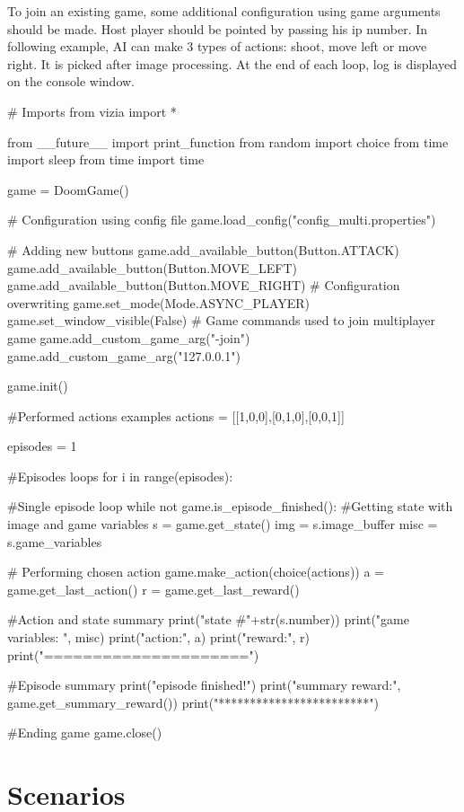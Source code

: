 \documentclass[english,bachelor,a4paper,twoside]{ppfcmthesis}
\begin{document}
	To join an existing game, some additional configuration using game arguments should be made. Host player should be pointed by passing his ip number. In following example, AI can make 3 types of actions: shoot, move left or move right. It is picked after image processing. At the end of each loop, log is displayed on the console window.

\begin{pblock}
# Imports
from vizia import *

from __future__ import print_function
from random import choice
from time import sleep
from time import time

game = DoomGame()

# Configuration using config file
game.load_config("config_multi.properties")

# Adding new buttons
game.add_available_button(Button.ATTACK)
game.add_available_button(Button.MOVE_LEFT)
game.add_available_button(Button.MOVE_RIGHT)
# Configuration overwriting 
game.set_mode(Mode.ASYNC_PLAYER)
game.set_window_visible(False)
# Game commands used to join multiplayer game
game.add_custom_game_arg("-join")
game.add_custom_game_arg("127.0.0.1")

game.init()

#Performed actions examples
actions = [[1,0,0],[0,1,0],[0,0,1]]

episodes = 1

#Episodes loops
for i in range(episodes):
	
	#Single episode loop
	while not game.is_episode_finished():
		#Getting state with image and game variables			
		s = game.get_state()
		img = s.image_buffer
		misc = s.game_variables

		# Performing chosen action
		game.make_action(choice(actions))
		a = game.get_last_action()
		r = game.get_last_reward()
			
		#Action and state summary
		print("state #"+str(s.number))
		print("game variables: ", misc)
		print("action:", a)
		print("reward:", r)
		print("=====================")
	
	#Episode summary
	print("episode finished!")
	print("summary reward:", game.get_summary_reward())
	print("************************")

#Ending game
game.close()
\end{pblock}

\chapter{Scenarios}\label{ch:scenarios}
\end{document}
